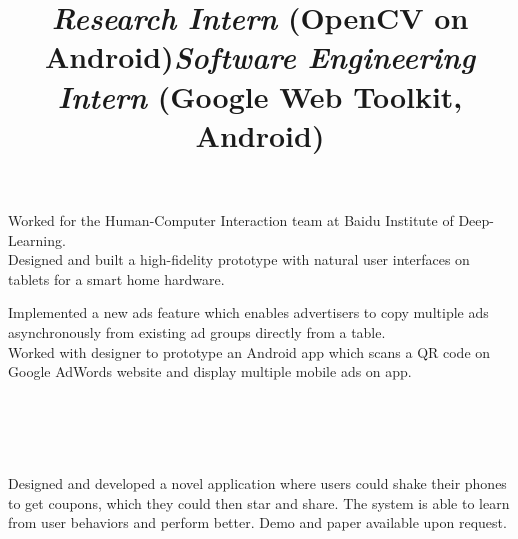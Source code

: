 \begin{resume}
\title{\textsl{Research Intern} (OpenCV on Android)}
\begin{position}
Worked for the Human-Computer Interaction team at Baidu Institute of Deep-Learning. \\
Designed and built a high-fidelity prototype with natural user interfaces on tablets for a smart home hardware.
\end{position}

\title{\textsl{Software Engineering Intern} (Google Web Toolkit, Android)}
\begin{position}
Implemented a new ads feature which enables advertisers to copy multiple ads asynchronously from existing ad groups directly from a table.\\
Worked with designer to prototype an Android app which scans a QR code on Google AdWords website and display multiple mobile ads on app.

\end{position}




\begin{formatb}
  \\
  \body\\
\end{formatb}

\section{}

\begin{position}
Designed and developed a novel application where users could shake their phones to get coupons, which they could then star and share. The system is able to learn from user behaviors and perform better. 
Demo and paper available upon request.
\end{position}


\end{resume}
